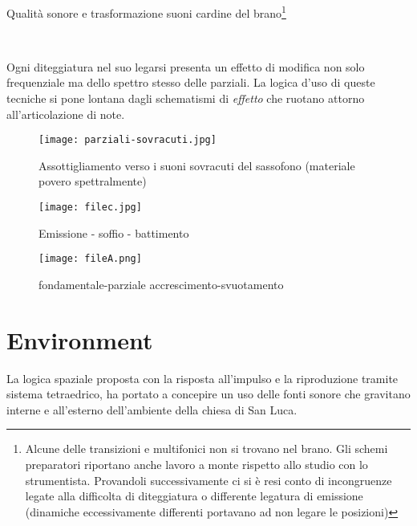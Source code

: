 Qualità sonore e trasformazione suoni cardine del brano\footnote{Alcune delle transizioni
e multifonici non si trovano nel brano. Gli schemi preparatori riportano anche lavoro a
monte rispetto allo studio con lo strumentista. Provandoli successivamente ci si è resi conto
di incongruenze legate alla difficolta di diteggiatura o differente
legatura di emissione (dinamiche eccessivamente differenti portavano ad non legare le posizioni)}

\clearpage

~

\clearpage





Ogni diteggiatura nel suo legarsi presenta un effetto di modifica non solo frequenziale ma
dello spettro stesso delle parziali. La logica d'uso di queste tecniche si pone
lontana dagli schematismi di \emph{effetto} che ruotano attorno all'articolazione di note. 

\vfill

\begin{figure}[h]
\centering
{\texttt{[image: parziali-sovracuti.jpg]}}
\caption[Assottigliamento verso i suoni sovracuti]{Assottigliamento verso i suoni sovracuti del sassofono (materiale povero spettralmente)}
\label{fig:assottiglimento}
\end{figure}
 
\vfill

\begin{figure}[h]
\centering
{\texttt{[image: filec.jpg]}}
\caption[Emissione - soffio - battimento]{Emissione - soffio - battimento}
\label{fig:soffio}
\end{figure}

\vfill
 
\begin{figure}[h]
\centering
{\texttt{[image: fileA.png]}}
\caption[Passaggio microtonale]{fondamentale-parziale accrescimento-svuotamento}
\label{fig:microtoni}
\end{figure}

\section{Environment}

La logica spaziale proposta con la risposta all'impulso e la riproduzione tramite sistema
tetraedrico, ha portato a concepire un uso delle fonti sonore che gravitano interne e
all’esterno dell'ambiente della chiesa di San Luca.

